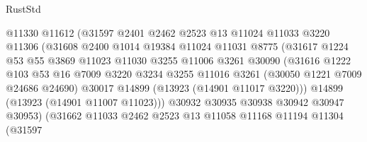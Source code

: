 \begin{lexlean}{RustStd}
\begin{coremodule}
                              @11330
                              @11612
                              (@31597
                                @2401
                                @2462
                                @2523
                                @13
                                @11024
                                @11033
                                @3220
                                @11306
                                (@31608
                                  @2400
                                  @1014
                                  @19384
                                  @11024
                                  @11031
                                  @8775
                                  (@31617
                                    @1224
                                    @53
                                    @55
                                    @3869
                                    @11023
                                    @11030
                                    @3255
                                    @11006
                                    @3261
                                    @30090
                                    (@31616
                                      @1222
                                      @103
                                      @53
                                      @16
                                      @7009
                                      @3220
                                      @3234
                                      @3255
                                      @11016
                                      @3261
                                      (@30050 @1221 @7009 @24686 @24690)
                                      @30017
                                      @14899
                                      (@13923 (@14901 @11017 @3220)))
                                    @14899
                                    (@13923 (@14901 @11007 @11023)))
                                  @30932
                                  @30935
                                  @30938
                                  @30942
                                  @30947
                                  @30953)
                                (@31662
                                  @11033
                                  @2462
                                  @2523
                                  @13
                                  @11058
                                  @11168
                                  @11194
                                  @11304
                                  (@31597

\end{coremodule}
\end{lexlean}

